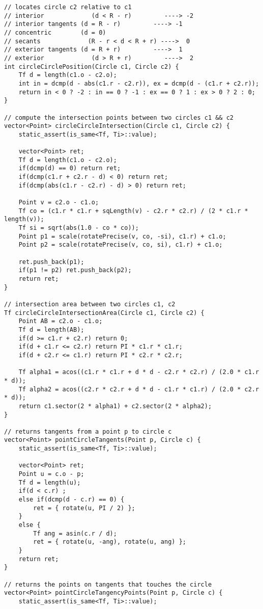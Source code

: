 \documentclass[FSZ,a4paper,onesided]{article}
\begin{document}
\begin{multicols*}{\COLS}
\begin{lstlisting}
// locates circle c2 relative to c1
// interior             (d < R - r)         ----> -2
// interior tangents (d = R - r)         ----> -1
// concentric        (d = 0)
// secants             (R - r < d < R + r) ---->  0
// exterior tangents (d = R + r)         ---->  1
// exterior             (d > R + r)         ---->  2
int circleCirclePosition(Circle c1, Circle c2) {
    Tf d = length(c1.o - c2.o);
    int in = dcmp(d - abs(c1.r - c2.r)), ex = dcmp(d - (c1.r + c2.r));
    return in < 0 ? -2 : in == 0 ? -1 : ex == 0 ? 1 : ex > 0 ? 2 : 0;
}

// compute the intersection points between two circles c1 && c2
vector<Point> circleCircleIntersection(Circle c1, Circle c2) {
    static_assert(is_same<Tf, Ti>::value);

    vector<Point> ret;
    Tf d = length(c1.o - c2.o);
    if(dcmp(d) == 0) return ret;
    if(dcmp(c1.r + c2.r - d) < 0) return ret;
    if(dcmp(abs(c1.r - c2.r) - d) > 0) return ret;

    Point v = c2.o - c1.o;
    Tf co = (c1.r * c1.r + sqLength(v) - c2.r * c2.r) / (2 * c1.r * length(v));
    Tf si = sqrt(abs(1.0 - co * co));
    Point p1 = scale(rotatePrecise(v, co, -si), c1.r) + c1.o;
    Point p2 = scale(rotatePrecise(v, co, si), c1.r) + c1.o;

    ret.push_back(p1);
    if(p1 != p2) ret.push_back(p2);
    return ret;
}

// intersection area between two circles c1, c2
Tf circleCircleIntersectionArea(Circle c1, Circle c2) {
    Point AB = c2.o - c1.o;
    Tf d = length(AB);
    if(d >= c1.r + c2.r) return 0;
    if(d + c1.r <= c2.r) return PI * c1.r * c1.r;
    if(d + c2.r <= c1.r) return PI * c2.r * c2.r;

    Tf alpha1 = acos((c1.r * c1.r + d * d - c2.r * c2.r) / (2.0 * c1.r * d));
    Tf alpha2 = acos((c2.r * c2.r + d * d - c1.r * c1.r) / (2.0 * c2.r * d));
    return c1.sector(2 * alpha1) + c2.sector(2 * alpha2);
}

// returns tangents from a point p to circle c
vector<Point> pointCircleTangents(Point p, Circle c) {
    static_assert(is_same<Tf, Ti>::value);

    vector<Point> ret;
    Point u = c.o - p;
    Tf d = length(u);
    if(d < c.r) ;
    else if(dcmp(d - c.r) == 0) {
        ret = { rotate(u, PI / 2) };
    }
    else {
        Tf ang = asin(c.r / d);
        ret = { rotate(u, -ang), rotate(u, ang) };
    }
    return ret;
}

// returns the points on tangents that touches the circle
vector<Point> pointCircleTangencyPoints(Point p, Circle c) {
    static_assert(is_same<Tf, Ti>::value);


\end{lstlisting}
\end{multicols*}
\end{document}
